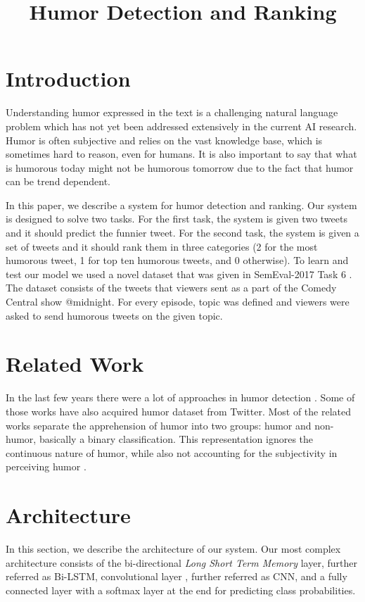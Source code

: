 \documentclass[10pt, a4paper]{article}
\title{Humor Detection and Ranking}
\begin{document}
\maketitleabstract

\section{Introduction}

Understanding humor expressed in the text is a challenging natural language problem which has not yet been addressed extensively in the current AI research. Humor is often subjective and relies on the vast knowledge base, which is sometimes hard to reason, even for humans. It is also important to say that what is humorous today might not be humorous tomorrow due to the fact that humor can be trend dependent.

In this paper, we describe a system for humor detection and
ranking. Our system is designed to solve two tasks. For the first task, the
system is given two tweets and it should predict the funnier tweet.
For the second task, the system is given a set of tweets and it should rank them
in three categories (2 for the most humorous tweet, 1 for top ten humorous
tweets, and 0 otherwise). To learn and test our model we used a novel dataset that was
given in SemEval-2017 Task 6 \citep{potash2016hashtagwars}. The dataset consists of
the tweets that viewers sent as a part of the Comedy Central show @midnight. For every
episode, topic was defined and viewers were asked to send humorous
tweets on the given topic.

\section{Related Work}

In the last few years there were a lot of approaches in humor detection \citep{mihalcea2005,reyes2013,zhang2014,barbieri2014,yang2015}.
Some of those works \citep{reyes2013,zhang2014,barbieri2014} have also acquired
humor dataset from Twitter. Most of the related works separate the apprehension 
of humor into two groups: humor and non-humor, basically a binary classification.
This representation ignores the continuous nature of humor, while also not accounting
for the subjectivity in perceiving humor \citep{potash2016hashtagwars}.

\section{Architecture}

In this section, we describe the architecture of our system. Our most complex
architecture consists of the bi-directional
\emph{Long Short Term Memory} \citep{lstm1997} layer, further referred as Bi-LSTM,
convolutional layer \citep{cnn1998}, further referred as CNN, and a fully connected
layer with a softmax layer at the end for predicting class probabilities.
\end{document}
